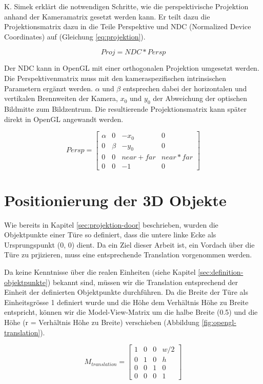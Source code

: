 K. Simek \cite{simek} erklärt die notwendigen Schritte, wie die perspektivische Projektion anhand der Kameramatrix gesetzt werden kann. Er teilt dazu die Projektionsmatrix dazu in die Teile Perspektive und NDC (Normalized Device Coordinates) auf (Gleichung \ref{eq:projektion}).

\begin{equation}
Proj = NDC * Persp
\label{eq:projektion}
\end{equation}

Der NDC kann in OpenGL mit einer orthogonalen Projektion umgesetzt werden. Die Perspektivenmatrix muss mit den kameraspezifischen intrinsischen Parametern ergänzt werden. $\alpha$ und $\beta$ entsprechen dabei der horizontalen und vertikalen Brennweiten der Kamera, $x_0$ und $y_0$ der Abweichung der optischen Bildmitte zum Bildzentrum. Die resultierende Projektionsmatrix kann später direkt in OpenGL angewandt werden.

\begin{equation}
Persp
=
\begin{bmatrix}
\alpha & 0 & -x_0 & 0 \\
0 & \beta & -y_0 & 0 \\
0 & 0 & near + far & near * far \\
0 & 0 & -1 & 0
\end{bmatrix} 
\end{equation}


\section{Positionierung der 3D Objekte}

Wie bereits in Kapitel \ref{sec:projektion-door} beschrieben, wurden die Objektpunkte einer Türe so definiert, dass die untere linke Ecke als Ursprungspunkt (0, 0) dient. Da ein Ziel dieser Arbeit ist, ein Vordach über die Türe zu prjizieren, muss eine entsprechende Translation vorgenommen werden.

Da keine Kenntnisse über die realen Einheiten (siehe Kapitel \ref{sec:definition-objektpunkte}) bekannt sind, müssen wir die Translation entsprechend der Einheit der definierten Objektpunkte durchführen. Da die Breite der Türe als Einheitsgrösse 1 definiert wurde und die Höhe dem Verhältnis Höhe zu Breite entspricht, können wir die Model-View-Matrix um die halbe Breite (0.5) und die Höhe (r = Verhältnis Höhe zu Breite) verschieben (Abbildung \ref{fig:opengl-translation}).

\begin{equation}
M_{translation}
=
\begin{bmatrix}
1 & 0 & 0 & w/2 \\
0 & 1 & 0 & h \\
0 & 0 & 1 & 0 \\
0 & 0 & 0 & 1
\end{bmatrix} 
\end{equation}


